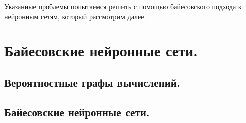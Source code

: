 \documentclass[14pt]{report}
\begin{document}
Указанные проблемы попытаемся решить с помощью байесовского подхода к нейронным сетям, который
 рассмотрим далее.

\section{Байесовские нейронные сети.}
\subsection{Вероятностные графы вычислений.}
\subsection{Байесовские нейронные сети.}
\end{document}
